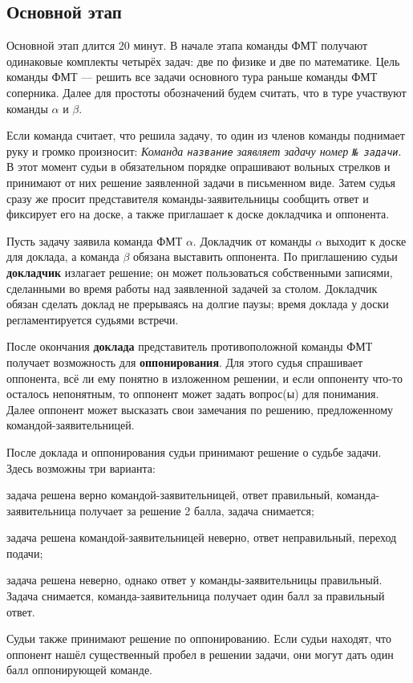 \documentclass[12pt,a4paper]{article}
\begin{document}
\subsection{Основной этап}
Основной этап длится 20 минут. В начале этапа команды ФМТ получают одинаковые комплекты четырёх задач: две по физике и две по математике. Цель команды ФМТ --- решить все задачи основного тура раньше команды ФМТ соперника. Далее для простоты обозначений будем считать, что в туре участвуют команды $\alpha$ и $\beta$.

Если команда считает, что решила задачу, то один из членов команды поднимает руку и громко произносит: \textsl{Команда \texttt{название} заявляет задачу номер \texttt{№ задачи}}. В этот момент судьи в обязательном порядке опрашивают вольных стрелков и принимают от них решение заявленной задачи в письменном виде. Затем судья сразу же просит представителя команды-заявительницы сообщить ответ и фиксирует его на доске, а также приглашает к доске докладчика и оппонента.

Пусть задачу заявила команда ФМТ $\alpha$. Докладчик от команды $\alpha$ выходит к доске для доклада, а команда $\beta$ обязана выставить оппонента. По приглашению судьи \textbf{докладчик} излагает решение; он может пользоваться собственными записями, сделанными во время работы над заявленной задачей за столом. Докладчик обязан сделать доклад не прерываясь на долгие паузы; время доклада у доски регламентируется судьями встречи.

После окончания \textbf{доклада} представитель противоположной команды ФМТ получает возможность для \textbf{оппонирования}. Для этого судья спрашивает оппонента, всё ли ему понятно в изложенном решении, и если оппоненту что-то осталось непонятным, то оппонент может задать вопрос(ы) для понимания. Далее оппонент может высказать свои замечания по решению, предложенному командой-заявительницей.

После доклада и оппонирования судьи принимают решение о судьбе задачи. Здесь возможны три варианта:
\begin{list}{--}{\leftmargin=10mm  \topsep=0mm  \itemsep=1pt \parsep=0mm \itemindent=-1.5pt}
\item задача решена верно командой-заявительницей, ответ правильный, команда-заявительница получает за решение 2 балла, задача снимается;
\item задача решена командой-заявительницей неверно, ответ неправильный, переход подачи;
\item задача решена неверно, однако ответ у команды-заявительницы правильный. Задача снимается, команда-заявительница получает один балл за правильный ответ.
\end{list}
Судьи также принимают решение по оппонированию. Если судьи находят, что оппонент нашёл существенный пробел в решении задачи, они могут дать один балл оппонирующей команде.
\end{document}
